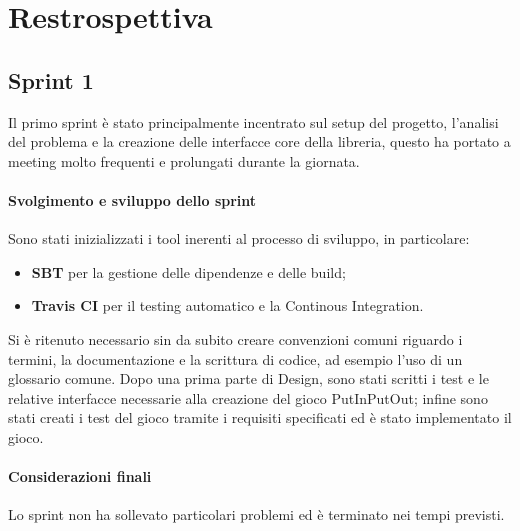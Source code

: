 \section{Restrospettiva}



\subsection{Sprint 1}
Il primo sprint è stato principalmente incentrato sul setup del progetto, l'analisi del problema e la creazione delle interfacce core della libreria, questo ha portato a meeting molto frequenti e prolungati durante la giornata.
\paragraph{Svolgimento e sviluppo dello sprint}
Sono stati inizializzati i tool inerenti al processo di sviluppo, in particolare:
\begin{itemize}
   \item \textbf{SBT} per la gestione delle dipendenze e delle build;
   \item \textbf{Travis CI} per il testing automatico e la Continous Integration.
\end{itemize}
Si è ritenuto necessario sin da subito creare convenzioni comuni riguardo i termini, la documentazione e la scrittura di codice, ad esempio l'uso di un glossario comune.
%
Dopo una prima parte di Design, sono stati scritti i test e le relative interfacce necessarie alla creazione del gioco PutInPutOut; infine sono stati creati i test del gioco tramite i requisiti specificati ed è stato implementato il gioco.
\paragraph{Considerazioni finali}
Lo sprint non ha sollevato particolari problemi ed è terminato nei tempi previsti.

